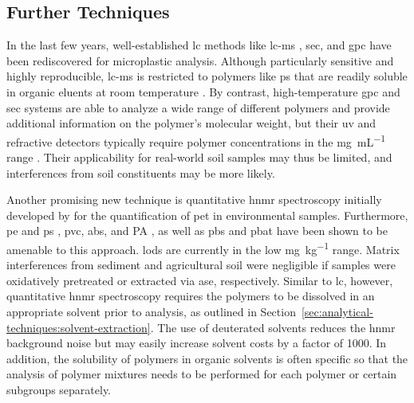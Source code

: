 \subsection{Further Techniques}
\label{sec:analytical-techniques:further-techniques}

In the last few years, well-established \ac{lc}
methods like \ac{lc-ms} \citep{SchirinziTrace2019}, \ac{sec}, and \ac{gpc} \citep{ElertComparison2017} have been rediscovered for microplastic analysis. Although particularly sensitive and highly reproducible, \ac{lc-ms} is restricted to polymers like \ac{ps} that are readily soluble in organic eluents at room temperature \citep{SchirinziTrace2019}. By contrast, high-temperature \ac{gpc} and \ac{sec} systems are able to analyze a wide range of different polymers and provide additional information on the polymer's molecular weight, but their \ac{uv} and refractive detectors typically require polymer concentrations in the \si{\milli\gram\per\milli\liter} range \citep{ElertComparison2017}. Their applicability for real-world soil samples may thus be limited, and interferences from soil constituents may be more likely.

Another promising new technique is quantitative \ac{hnmr} spectroscopy initially developed by \citet{PeezQuantitative2019} for the quantification of \ac{pet} in environmental samples. Furthermore, \ac{pe} and \ac{ps} \citep{PeezFirst2019}, \ac{pvc}, \ac{abs}, and PA \citep{PeezQuantitative2020}, as well as \ac{pbs} and \ac{pbat} \citep{NelsonQuantification2019} have been shown to be amenable to this approach. \Acp{lod} are currently in the low \si{\milli\gram\per\kilo\gram} range. Matrix interferences from sediment \citep{PeezQuantitative2019} and agricultural soil \citep{NelsonQuantification2019} were negligible if samples were oxidatively pretreated or extracted via \ac{ase}, respectively. Similar to \ac{lc}, however, quantitative \ac{hnmr} spectroscopy requires the polymers to be dissolved in an appropriate solvent prior to analysis, as outlined in Section~\ref{sec:analytical-techniques:solvent-extraction}. The use of deuterated solvents reduces the \ac{hnmr} background noise but may easily increase solvent costs by a factor of 1000. In addition, the solubility of polymers in organic solvents is often specific so that the analysis of polymer mixtures needs to be performed for each polymer or certain subgroups separately.

